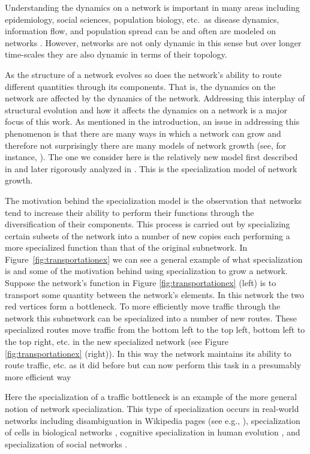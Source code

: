 \documentclass[12pt]{thesis}
\begin{document}
Understanding the {dynamics on} a network is important in many areas including epidemiology, social sciences, population biology, etc.~as disease dynamics, information flow, and population spread can be and often are modeled on networks \cite{Prulzj07}.
However, networks are not only dynamic in this sense but over longer time-scales they are also dynamic in terms of their topology.

As the structure of a network evolves so does the network's ability to route different quantities through its components. 
That is, the {dynamics on} the network {are} affected by the {dynamics of} the network.
Addressing this interplay of structural evolution and how it affects the {dynamics on} a network is a major focus of this work.
As mentioned in the introduction, an issue in addressing this {phenomenon} is that there are many ways in which a network can grow and therefore not surprisingly there are many models of network growth (see, for instance, \cite{Newman10}).
The one we consider here is the relatively new model first described in \cite{8} and later rigorously analyzed in \cite{Bunimovich20}.
This is the specialization model of network growth.

The motivation behind the specialization model is the observation that networks tend to increase their ability to perform their functions through the diversification of their components.
This process is carried out by specializing certain subsets of the network into a number of new copies each performing a more specialized function than that of the original subnetwork.
In Figure~\ref{fig:transportationex} we can see a general example of what specialization is and some of the motivation behind using specialization to grow a network.
Suppose the network's function in Figure \ref{fig:transportationex} (left) is to transport some quantity between the network's elements.
In this network the two red vertices form a bottleneck. 
To more efficiently move traffic through the network this subnetwork can be specialized into a number of new routes.
These specialized routes move traffic from the bottom left to the top left, bottom left to the top right, etc. in the new specialized network (see Figure \ref{fig:transportationex} (right)).
In this way the network maintains its ability to route traffic, etc. as it did before but can now perform this task in a presumably more efficient way

Here the specialization of a traffic bottleneck is an example of the more general notion of {network specialization}.
This type of specialization occurs in real-world networks including disambiguation in Wikipedia pages (see e.g., \cite{Bunimovich20}), specialization of cells in biological networks \cite{Sporns13,Herskowitz89, Nikolic17}, cognitive specialization in human evolution \cite{Povinelli95}, and specialization of social networks \cite{Salz01}.
\end{document}
